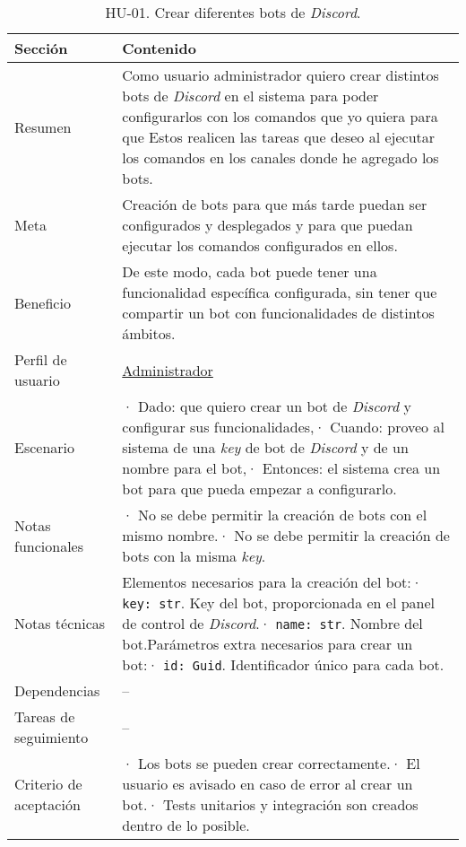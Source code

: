 \begin{table}[H]
    \centering
    \def\arraystretch{1.25}
    \begin{adjustbox}{max width=\textwidth}
    \begin{tabularx}{\textwidth}{|l|L|}
    \hline
        \textbf{Sección} & \textbf{Contenido} \\ \hline
    \hline
        Resumen & Como usuario administrador quiero crear distintos bots de \textit{Discord} en el sistema para poder configurarlos con los comandos que yo quiera para que Estos realicen las tareas que deseo al ejecutar los comandos en los canales donde he agregado los bots. \\ \hline
        Meta & Creación de bots para que más tarde puedan ser configurados y desplegados y para que puedan ejecutar los comandos configurados en ellos. \\ \hline
        Beneficio & De este modo, cada bot puede tener una funcionalidad específica configurada, sin tener que compartir un bot con funcionalidades de distintos ámbitos. \\ \hline
        Perfil de usuario & \hyperref[sec:personaAdmin]{Administrador} \\ \hline
        Escenario & · Dado: que quiero crear un bot de \textit{Discord} y configurar sus funcionalidades,\linebreak · Cuando: proveo al sistema de una \textit{key} de bot de \textit{Discord} y de un nombre para el bot,\linebreak · Entonces: el sistema crea un bot para que pueda empezar a configurarlo. \\ \hline
        Notas funcionales & · No se debe permitir la creación de bots con el mismo nombre.\linebreak · No se debe permitir la creación de bots con la misma \textit{key}. \\ \hline
        Notas técnicas & Elementos necesarios para la creación del bot:\linebreak · \verb|key: str|. Key del bot, proporcionada en el panel de control de \textit{Discord}.\linebreak · \verb|name: str|. Nombre del bot.\linebreak \linebreak Parámetros extra necesarios para crear un bot:\linebreak · \verb|id: Guid|. Identificador único para cada bot. \\ \hline
        Dependencias & – \\ \hline
        Tareas de seguimiento & – \\ \hline
        Criterio de aceptación & · Los bots se pueden crear correctamente.\linebreak · El usuario es avisado en caso de error al crear un bot.\linebreak · Tests unitarios y integración son creados dentro de lo posible. \\ \hline
    \end{tabularx}
    \end{adjustbox}
    \caption{HU-01. Crear diferentes bots de \textit{Discord}.}
\end{table}


